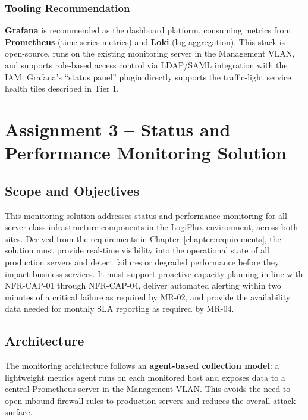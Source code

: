 \subsubsection{Tooling Recommendation}

\textbf{Grafana} is recommended as the dashboard platform, consuming metrics from \textbf{Prometheus} (time-series metrics) and \textbf{Loki} (log aggregation). This stack is open-source, runs on the existing monitoring server in the Management VLAN, and supports role-based access control via LDAP/SAML integration with the IAM. Grafana's ``status panel'' plugin directly supports the traffic-light service health tiles described in Tier 1.

\section{Assignment 3 -- Status and Performance Monitoring Solution}
\label{sec:assignment3}

\subsection{Scope and Objectives}

This monitoring solution addresses status and performance monitoring for all server-class infrastructure components in the LogiFlux environment, across both sites. Derived from the requirements in Chapter~\ref{chapter:requirements}, the solution must provide real-time visibility into the operational state of all production servers and detect failures or degraded performance before they impact business services. It must support proactive capacity planning in line with NFR-CAP-01 through NFR-CAP-04, deliver automated alerting within two minutes of a critical failure as required by MR-02, and provide the availability data needed for monthly SLA reporting as required by MR-04.

\subsection{Architecture}

The monitoring architecture follows an \textbf{agent-based collection model}: a lightweight metrics agent runs on each monitored host and exposes data to a central Prometheus server in the Management VLAN. This avoids the need to open inbound firewall rules to production servers and reduces the overall attack surface.

